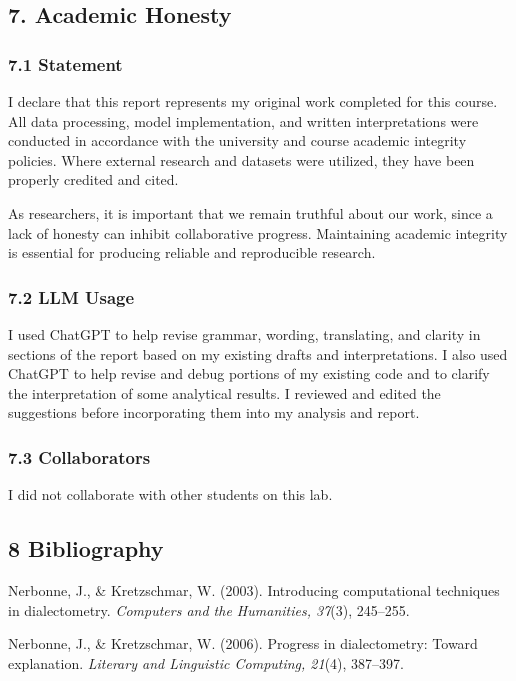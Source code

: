 \documentclass[
]{article}
\begin{document}
\subsection{7. Academic Honesty}\label{academic-honesty}

\subsubsection{7.1 Statement}\label{statement}

I declare that this report represents my original work completed for
this course. All data processing, model implementation, and written
interpretations were conducted in accordance with the university and
course academic integrity policies. Where external research and datasets
were utilized, they have been properly credited and cited.

As researchers, it is important that we remain truthful about our work,
since a lack of honesty can inhibit collaborative progress. Maintaining
academic integrity is essential for producing reliable and reproducible
research.

\subsubsection{7.2 LLM Usage}\label{llm-usage}

I used ChatGPT to help revise grammar, wording, translating, and clarity
in sections of the report based on my existing drafts and
interpretations. I also used ChatGPT to help revise and debug portions
of my existing code and to clarify the interpretation of some analytical
results. I reviewed and edited the suggestions before incorporating them
into my analysis and report.

\subsubsection{7.3 Collaborators}\label{collaborators}

I did not collaborate with other students on this lab.

\subsection{8 Bibliography}\label{bibliography}

Nerbonne, J., \& Kretzschmar, W. (2003). Introducing computational
techniques in dialectometry. \emph{Computers and the Humanities, 37}(3),
245--255.

Nerbonne, J., \& Kretzschmar, W. (2006). Progress in dialectometry:
Toward explanation. \emph{Literary and Linguistic Computing, 21}(4),
387--397.
\end{document}
